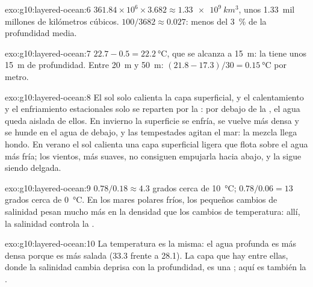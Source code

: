 \begin{solution}{exo:g10:layered-ocean:6}
$361.84\times10^6 \times 3.682 \approx \qty{1.33e9}{km^3}$, unos
\num{1.33}~mil millones de kilómetros cúbicos. $100/3682 \approx 0.027$:
menos del \qty{3}{\percent} de la profundidad media.
\end{solution}

\begin{solution}{exo:g10:layered-ocean:7}
$22.7 - 0.5 = \qty{22.2}{\degreeCelsius}$, que se alcanza a \qty{15}{m}: la
 tiene unos \qty{15}{m} de profundidad. Entre \qty{20}{m} y
\qty{50}{m}: $(21.8 - 17.3)/30 = \qty{0.15}{\degreeCelsius}$ por metro.
\end{solution}

\begin{solution}{exo:g10:layered-ocean:8}
El sol solo calienta la capa superficial, y el calentamiento y el
enfriamiento estacionales solo se reparten por la : por debajo
de la , el agua queda aislada de ellos. En invierno la superficie
se enfría, se vuelve más densa y se hunde en el agua de debajo, y las
tempestades agitan el mar: la mezcla llega hondo. En verano el sol calienta
una capa superficial ligera que flota sobre el agua más fría; los vientos,
más suaves, no consiguen empujarla hacia abajo, y la  sigue
siendo delgada.
\end{solution}

\begin{solution}{exo:g10:layered-ocean:9}
$0.78/0.18 \approx 4.3$ grados cerca de \qty{10}{\degreeCelsius};
$0.78/0.06 = 13$ grados cerca de \qty{0}{\degreeCelsius}. En los mares
polares fríos, los pequeños cambios de salinidad pesan mucho más en la
densidad que los cambios de temperatura: allí, la salinidad controla la
.
\end{solution}

\begin{solution}{exo:g10:layered-ocean:10}
La temperatura es la misma: el agua profunda es más densa porque es más
salada (33.3 frente a 28.1). La capa que hay entre ellas, donde la salinidad
cambia deprisa con la profundidad, es una ; aquí es también la
.
\end{solution}

